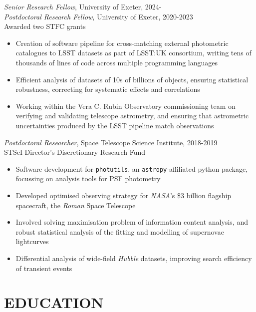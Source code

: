 \documentclass[letter, margin, 10pt]{res} %
\begin{document}
\begin{resume}
{\sl Senior Research Fellow}, University of Exeter, 2024-\\
{\sl Postdoctoral Research Fellow}, University of Exeter, 2020-2023\\
\null\quad\quad Awarded two STFC grants
\begin{itemize}[noitemsep,topsep=0pt,parsep=0pt,partopsep=0pt]
\item Creation of software pipeline for cross-matching external photometric catalogues to LSST datasets as part of LSST:UK consortium, writing tens of thousands of lines of code across multiple programming languages
\item Efficient analysis of datasets of 10s of billions of objects, ensuring statistical robustness, correcting for systematic effects and correlations
\item Working within the Vera C. Rubin Observatory commissioning team on verifying and validating telescope astrometry, and ensuring that astrometric uncertainties produced by the LSST pipeline match observations
\end{itemize}
\vspace{-10pt}
{\sl Postdoctoral Researcher}, Space Telescope Science Institute, 2018-2019\\
\null\quad\quad STScI Director's Discretionary Research Fund
\begin{itemize}[noitemsep,topsep=0pt,parsep=0pt,partopsep=0pt]
\item Software development for \texttt{photutils}, an \texttt{astropy}-affiliated python package, focussing on analysis tools for PSF photometry
\item Developed optimised observing strategy for \textit{NASA}'s \$3 billion flagship spacecraft, the \textit{Roman} Space Telescope
\item Involved solving maximisation problem of information content analysis, and robust statistical analysis of the fitting and modelling of supernovae lightcurves
\item Differential analysis of wide-field \textit{Hubble} datasets, improving search efficiency of transient events
\end{itemize}
\vspace{-6pt}
\section{EDUCATION}


\end{resume}
\end{document}
